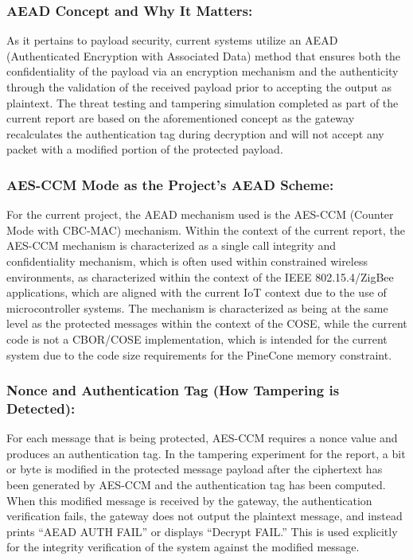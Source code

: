 \documentclass[a4paper]{scrartcl}
\begin{document}
    \subsubsection{AEAD Concept and Why It Matters:}

        As it pertains to payload security, current systems utilize an AEAD (Authenticated Encryption with Associated Data) method that ensures both the confidentiality of the payload via an encryption mechanism and the authenticity through the validation of the received payload prior to accepting the output as plaintext. The threat testing and tampering simulation completed as part of the current report are based on the aforementioned concept as the gateway recalculates the authentication tag during decryption and will not accept any packet with a modified portion of the protected payload.

        \subsubsection{AES-CCM Mode as the Project’s AEAD Scheme:}

        For the current project, the AEAD mechanism used is the AES-CCM (Counter Mode with CBC-MAC) mechanism. Within the context of the current report, the AES-CCM mechanism is characterized as a single call integrity and confidentiality mechanism, which is often used within constrained wireless environments, as characterized within the context of the IEEE 802.15.4/ZigBee applications, which are aligned with the current IoT context due to the use of microcontroller systems. The mechanism is characterized as being at the same level as the protected messages within the context of the COSE, while the current code is not a CBOR/COSE implementation, which is intended for the current system due to the code size requirements for the PineCone memory constraint.

        \subsubsection{Nonce and Authentication Tag (How Tampering is Detected):}

        For each message that is being protected, AES-CCM requires a nonce value and produces an authentication tag. In the tampering experiment for the report, a bit or byte is modified in the protected message payload after the ciphertext has been generated by AES-CCM and the authentication tag has been computed. When this modified message is received by the gateway, the authentication verification fails, the gateway does not output the plaintext message, and instead prints “AEAD AUTH FAIL” or displays “Decrypt FAIL.” This is used explicitly for the integrity verification of the system against the modified message.
\end{document}
